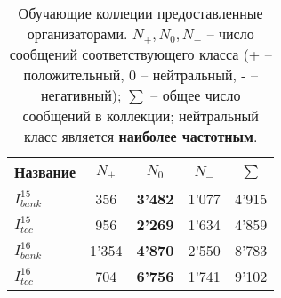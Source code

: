 \begin{table}[htp!]
\caption{Обучающие коллеции предоставленные организаторами.
        {\bf $N_+, N_0, N_-$} -- число сообщений соответствующего класса
    (+ -- положительный, 0 -- нейтральный, - -- негативный);
        {\bf $\sum$} -- общее число сообщений в коллекции;
        нейтральный класс является {\bf наиболее частотным}.
    }
\label{table:trainCollections}
\centering
\begin{tabular}{lcccc}
\hline
Название          & $N_+$ & $N_0$          & $N_-$ & $\sum$ \\ \hline
$I_{bank}^{15}$ & 356   & \textbf{3'482} & 1'077 & 4'915  \\
$I_{tcc}^{15}$  & 956   & \textbf{2'269} & 1'634 & 4'859  \\
$I_{bank}^{16}$ & 1'354 & \textbf{4'870} & 2'550 & 8'783  \\
$I_{tcc}^{16}$  & 704   & \textbf{6'756} & 1'741 & 9'102  \\ \hline
\end{tabular}
\end{table}

